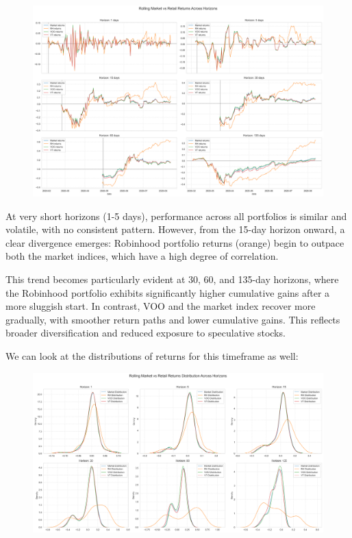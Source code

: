 \begin{figure}[h]
    \centering
    \includegraphics[width=1\linewidth]{../images/returns_comparison_pandemic.png}
\end{figure}
At very short horizons (1-5 days), performance across all portfolios is similar and volatile, with no consistent pattern. However, from the 15-day horizon onward, a clear divergence emerges: Robinhood portfolio returns (orange) begin to outpace both the market indices, which have a high degree of correlation.

This trend becomes particularly evident at 30, 60, and 135-day horizons, where the Robinhood portfolio exhibits significantly higher cumulative gains after a more sluggish start. 
In contrast, VOO and the market index recover more gradually, with smoother return paths and lower cumulative gains. This reflects broader diversification and reduced exposure to speculative stocks.

We can look at the distributions of returns for this timeframe as well:
\begin{figure}[H]
    \centering
    \includegraphics[width=1\linewidth]{../images/distributions_comparison_pandemic.png}
\end{figure}

